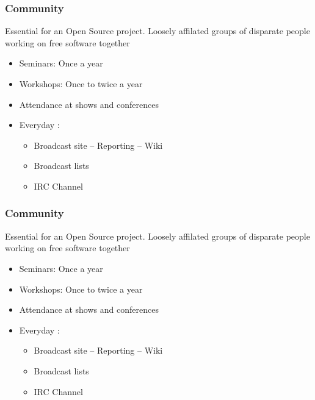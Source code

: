 \documentclass{beamer}
\begin{document}
    \begin{frame}
	    \frametitle{Community}

		Essential for an Open Source project.
		Loosely affilated groups of disparate people working on
		free software together

		\begin{itemize}
			\item Seminars: Once a year
			\item Workshops: Once to twice a year
			\item Attendance at shows and conferences
			\item Everyday :
			\begin{itemize}
				\item Broadcast site -- Reporting -- Wiki
				\item Broadcast lists
				\item IRC Channel
			\end{itemize}
		\end{itemize}
	\end{frame}

	\begin{frame}
		\frametitle{Community}

		Essential for an Open Source project.
		Loosely affilated groups of disparate people working on
		free software together

		\begin{itemize}
			\item Seminars: Once a year
			\item Workshops: Once to twice a year
			\item Attendance at shows and conferences
			\item Everyday :
			\begin{itemize}
                \item Broadcast site -- Reporting -- Wiki
				\item Broadcast lists
				\item IRC Channel
			\end{itemize}
        \end{itemize}
    \end{frame}
\end{document}
